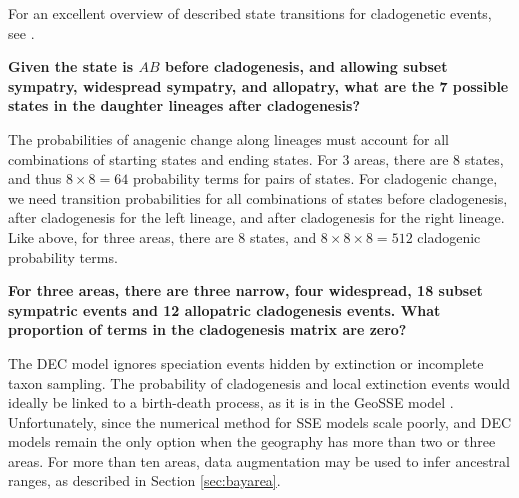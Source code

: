 For an excellent overview of described state transitions for cladogenetic events, see \citet{Matzke2012}.

{\bf {} Given the state is $AB$ before cladogenesis, and allowing subset sympatry, widespread sympatry, and allopatry, what are the 7 possible states in the daughter lineages after cladogenesis?}

The probabilities of anagenic change along lineages must account for all combinations of starting states and ending states.
For 3 areas, there are 8 states, and thus $8 \times 8 = 64$ probability terms for pairs of states.
For cladogenic change, we need transition probabilities for all combinations of states before cladogenesis, after cladogenesis for the left lineage, and after cladogenesis for the right lineage.
Like above, for three areas, there are 8 states, and $8 \times 8 \times 8 = 512$ cladogenic probability terms.

{\bf {} For three areas, there are three narrow, four widespread, 18 subset sympatric events and 12 allopatric cladogenesis events. What proportion of terms in the cladogenesis matrix are zero?}

The DEC model ignores speciation events hidden by extinction or incomplete taxon sampling.
The probability of cladogenesis and local extinction events would ideally be linked to a birth-death process, as it is in the GeoSSE model \citep{Goldberg2011}.
Unfortunately, since the numerical method for SSE models scale poorly, and DEC models remain the only option when the geography has more than two or three areas.
For more than ten areas, data augmentation may be used to infer ancestral ranges, as described in Section \ref{sec:bayarea}.


